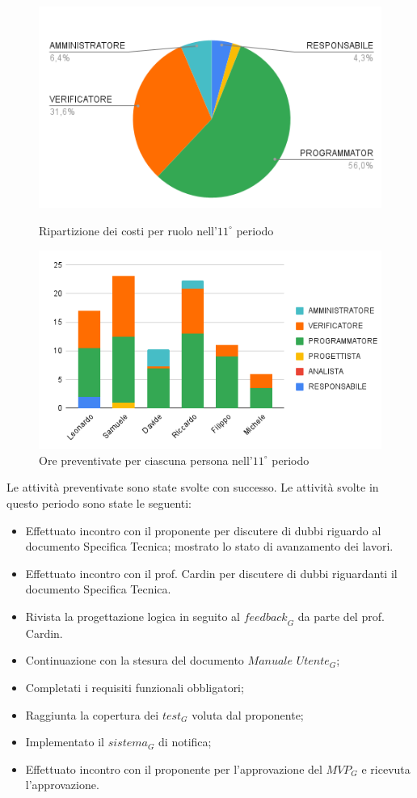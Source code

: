 \begin{figure}[H]
  \centering
  \includegraphics[width=0.6\linewidth]{grafici/11_periodo_torta.png}
  \caption{Ripartizione dei costi per ruolo nell'$11^\circ$ periodo}
        \vspace{5mm}
  \includegraphics[width=0.7\linewidth]{grafici/11_periodo_istogramma.png}
  \caption{Ore preventivate per ciascuna persona nell'$11^\circ$ periodo}
\end{figure}
Le attività preventivate sono state svolte con successo.
Le attività svolte in questo periodo sono state le seguenti:
\begin{itemize}
    \item Effettuato incontro con il proponente per discutere di dubbi riguardo al documento Specifica Tecnica; mostrato lo stato di avanzamento dei lavori.
    \item Effettuato incontro con il prof. Cardin per discutere di dubbi riguardanti il documento Specifica Tecnica.
\item Rivista la progettazione logica in seguito al $\textit{feedback}_G$ da parte del prof. Cardin.
\item Continuazione con la stesura del documento $\textit{Manuale Utente}_G$;
\item Completati i requisiti funzionali obbligatori;
\item Raggiunta la copertura dei $\textit{test}_G$ voluta dal proponente;
\item Implementato il $\textit{sistema}_G$ di notifica;
\item Effettuato incontro con il proponente per l'approvazione del $\textit{MVP}_G$ e ricevuta l'approvazione.
\end{itemize}
